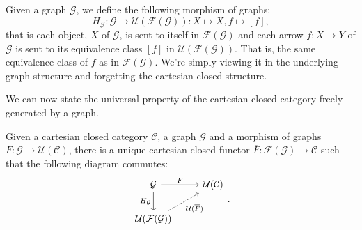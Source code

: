\begin{definition}
    Given a graph $\mathcal G$, we define the following morphism of graphs:
    \[ H_\mathcal G : \mathcal G \to \mathcal U(\mathcal F(\mathcal G)) : X \mapsto X, f \mapsto [f],\]
    that is each object, $X$ of $\mathcal G$, is sent to itself in $\mathcal F(\mathcal G)$ and
    each arrow $f : X \to Y$ of $\mathcal G$ is sent to its equivalence class $[f]$ in $\mathcal U(\mathcal F(\mathcal G))$. That is, the same 
    equivalence class of $f$ as in $\mathcal F(\mathcal G)$. We're simply viewing it in the underlying graph structure and forgetting the cartesian closed structure.
\end{definition}

We can now state the universal property of the cartesian closed category freely generated by a graph.

\begin{theorem}
    Given a cartesian closed category $\mathcal C$, a graph $\mathcal G$ and a morphism of graphs $F : \mathcal G \to \mathcal U(\mathcal C)$,
    there is a unique cartesian closed functor $\overline F : \mathcal F(\mathcal G) \to \mathcal C$ such that the following diagram commutes:
    \[\begin{tikzcd}
        {\mathcal G} & {\mathcal U(\mathcal C)} \\
        {\mathcal U(\mathcal F(\mathcal G))}
        \arrow["F", from=1-1, to=1-2]
        \arrow["{H_{\mathcal G}}"', from=1-1, to=2-1]
        \arrow["{\mathcal U(\overline F)}"', dashed, from=2-1, to=1-2]
    \end{tikzcd}.\]
\end{theorem}

